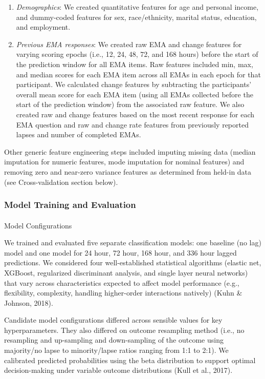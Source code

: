 \documentclass[
]{agujournal2019}
\makeatletter
\let\oldparagraph\paragraph
\renewcommand{\paragraph}{
    \@ifstar
      \xxxParagraphStar
      \xxxParagraphNoStar
  }
\newcommand{\xxxParagraphStar}[1]{\oldparagraph*{#1}\mbox{}}
\newcommand{\xxxParagraphNoStar}[1]{\oldparagraph{#1}\mbox{}}
\makeatother
\begin{document}
\begin{enumerate}
\def\labelenumi{\arabic{enumi}.}
\item
  \emph{Demographics}: We created quantitative features for age and
  personal income, and dummy-coded features for sex, race/ethnicity,
  marital status, education, and employment.
\item
  \emph{Previous EMA responses}: We created raw EMA and change features
  for varying scoring epochs (i.e., 12, 24, 48, 72, and 168 hours)
  before the start of the prediction window for all EMA items. Raw
  features included min, max, and median scores for each EMA item across
  all EMAs in each epoch for that participant. We calculated change
  features by subtracting the participants' overall mean score for each
  EMA item (using all EMAs collected before the start of the prediction
  window) from the associated raw feature. We also created raw and
  change features based on the most recent response for each EMA
  question and raw and change rate features from previously reported
  lapses and number of completed EMAs.
\end{enumerate}

Other generic feature engineering steps included imputing missing data
(median imputation for numeric features, mode imputation for nominal
features) and removing zero and near-zero variance features as
determined from held-in data (see Cross-validation section below).

\subsubsection{Model Training and
Evaluation}\label{model-training-and-evaluation}

\paragraph{Model Configurations}\label{model-configurations}

We trained and evaluated five separate classification models: one
baseline (no lag) model and one model for 24 hour, 72 hour, 168 hour,
and 336 hour lagged predictions. We considered four well-established
statistical algorithms (elastic net, XGBoost, regularized discriminant
analysis, and single layer neural networks) that vary across
characteristics expected to affect model performance (e.g., flexibility,
complexity, handling higher-order interactions natively) (Kuhn \&
Johnson, 2018).

Candidate model configurations differed across sensible values for key
hyperparameters. They also differed on outcome resampling method (i.e.,
no resampling and up-sampling and down-sampling of the outcome using
majority/no lapse to minority/lapse ratios ranging from 1:1 to 2:1). We
calibrated predicted probabilities using the beta distribution to
support optimal decision-making under variable outcome distributions
(Kull et al., 2017).
\end{document}
